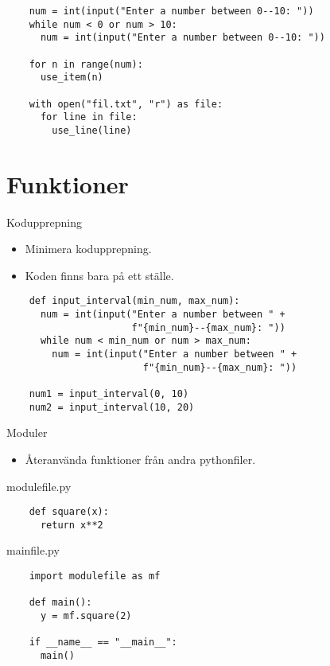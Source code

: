 \begin{frame}[fragile]
  \begin{verbatim}
    num = int(input("Enter a number between 0--10: "))
    while num < 0 or num > 10:
      num = int(input("Enter a number between 0--10: "))

    for n in range(num):
      use_item(n)

    with open("fil.txt", "r") as file:
      for line in file:
        use_line(line)
  \end{verbatim}
\end{frame}


\section{Funktioner}

\begin{frame}[fragile]
  \begin{block}{Kodupprepning}
    \begin{itemize}
      \item Minimera kodupprepning.
      \item Koden finns bara på ett ställe.
    \end{itemize}
  \end{block}

  \begin{verbatim}
    def input_interval(min_num, max_num):
      num = int(input("Enter a number between " +
                      f"{min_num}--{max_num}: "))
      while num < min_num or num > max_num:
        num = int(input("Enter a number between " +
                        f"{min_num}--{max_num}: "))

    num1 = input_interval(0, 10)
    num2 = input_interval(10, 20)
  \end{verbatim}
\end{frame}

\begin{frame}[fragile]
  \begin{block}{Moduler}
    \begin{itemize}
      \item Återanvända funktioner från andra pythonfiler.
    \end{itemize}
  \end{block}

  modulefile.py \hrulefill
  \begin{verbatim}
    def square(x):
      return x**2
  \end{verbatim}

  \vspace{1em}
  mainfile.py \hrulefill
  \begin{verbatim}
    import modulefile as mf

    def main():
      y = mf.square(2)

    if __name__ == "__main__":
      main()
  \end{verbatim}
\end{frame}

